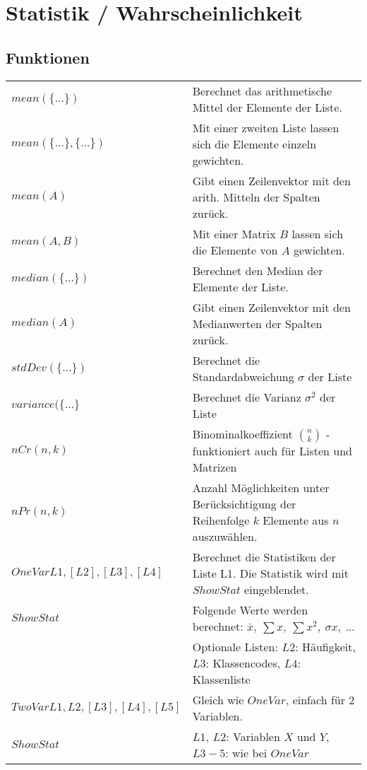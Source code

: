 \section{Statistik / Wahrscheinlichkeit}

\subsection{Funktionen}
\begin{tabular}{|l|l|}
	\hline
	$mean(\{...\})$				& Berechnet das arithmetische Mittel der Elemente der Liste. \\
	$mean(\{...\},\{...\})$		& Mit einer zweiten Liste lassen sich die Elemente einzeln gewichten. \\ \hline
	$mean(A)$					& Gibt einen Zeilenvektor mit den arith. Mitteln der Spalten zurück. \\ 
	$mean(A,B)$					& Mit einer Matrix $B$ lassen sich die Elemente von $A$ gewichten. \\ \hline
	$median(\{...\})$			& Berechnet den Median der Elemente der Liste. \\
	$median(A)$					& Gibt einen Zeilenvektor mit den Medianwerten der Spalten zurück. \\ \hline
	$stdDev(\{...\})$			& Berechnet die Standardabweichung $\sigma$ der Liste \\ \hline
	$variance(\{...\}$			& Berechnet die Varianz $\sigma ^2$ der Liste \\ \hline
	$nCr(n,k)$					& Binominalkoeffizient $\binom{n}{k}$ - funktioniert auch für Listen und Matrizen	\\ \hline
	$nPr(n,k)$					& Anzahl Möglichkeiten unter Berücksichtigung der Reihenfolge $k$ Elemente aus $n$ auszuwählen. \\ \hline
	$OneVar L1,[L2],[L3],[L4]$	& Berechnet die Statistiken der Liste L1. Die Statistik wird mit $ShowStat$ eingeblendet. \\
	$ShowStat$					& Folgende Werte werden berechnet: $ \bar x, \: \sum x, \: \sum x^2, \: \sigma x, \: ...$ \\
								& Optionale Listen: $L2$: Häufigkeit, $L3$: Klassencodes, $L4$: Klassenliste \\ \hline
	$TwoVar L1,L2,[L3],[L4],[L5]$ & Gleich wie $OneVar$, einfach für 2 Variablen. \\
	$ShowStat$ & $L1$, $L2$: Variablen $X$ und $Y$, $L3-5$: wie bei $OneVar$ \\ \hline
\end{tabular}

